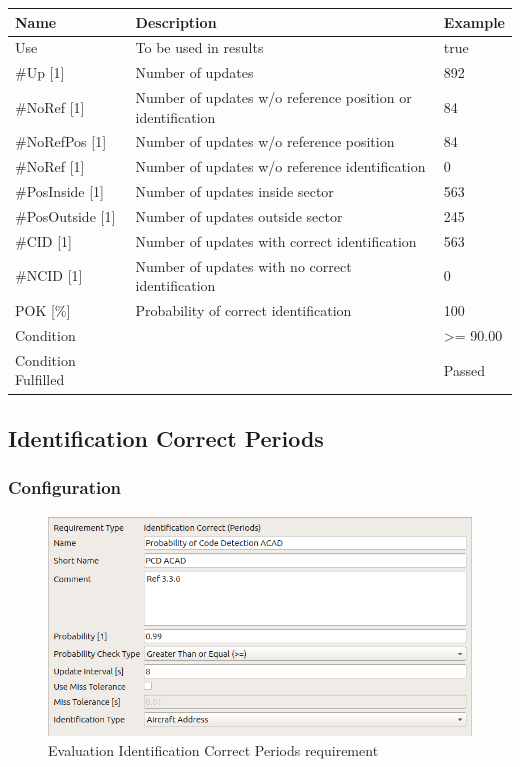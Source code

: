 \begin{center}
 \begin{table}[H]
  \begin{tabularx}{\textwidth}{ | l | X |  l | }
    \hline
    \textbf{Name} & \textbf{Description} & \textbf{Example} \\ \hline
    Use & To be used in results & true \\ \hline
    \#Up [1] & Number of updates & 892 \\ \hline
    \#NoRef [1] & Number of updates w/o reference position or identification & 84 \\ \hline
    \#NoRefPos [1] & Number of updates w/o reference position  & 84 \\ \hline
    \#NoRef [1] & Number of updates w/o reference identification & 0 \\ \hline
    \#PosInside [1] & Number of updates inside sector & 563 \\ \hline
    \#PosOutside [1] & Number of updates outside sector & 245 \\ \hline
    \#CID [1] & Number of updates with correct identification & 563 \\ \hline
    \#NCID [1] & Number of updates with no correct identification & 0 \\ \hline
    POK [\%] & Probability of correct identification & 100 \\ \hline
    Condition &  & >= 90.00 \\ \hline
    Condition Fulfilled &  & Passed \\ \hline
\end{tabularx}
\end{table}
\end{center}

\subsection{Identification Correct Periods}
\label{sec:eval_req_id_correct_periods} 

\subsubsection{Configuration}

\begin{figure}[H]
    \includegraphics[width=14cm,frame]{figures/eval_req_id_correct_periods.png}
  \caption{Evaluation Identification Correct Periods requirement}
\end{figure}

